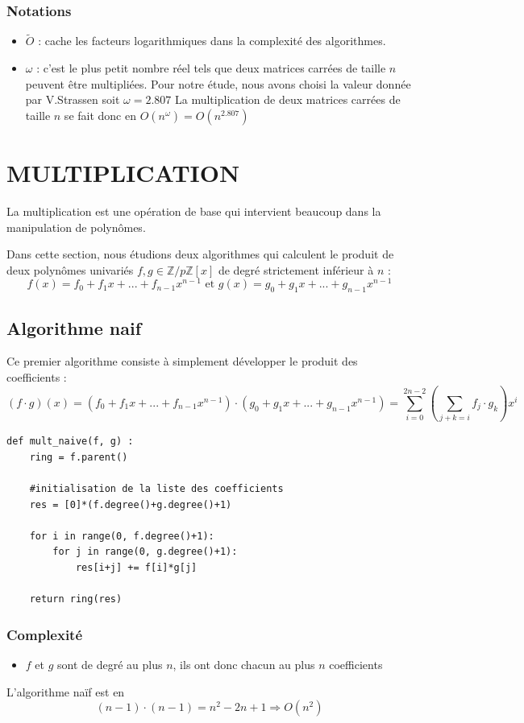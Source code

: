 \documentclass[a4paper]{article}
\begin{document}
\subsubsection*{Notations}
\begin{itemize}
\item $\tilde{O}$ : cache les facteurs logarithmiques dans la complexité des algorithmes.
\item $\omega$ : c'est le plus petit nombre réel tels que deux matrices carrées de taille $n$ peuvent être multipliées. Pour notre étude, nous avons choisi la valeur donnée par V.Strassen soit $\omega=2.807$
La multiplication de deux matrices carrées de taille $n$ se fait donc en $O(n^\omega)=O(n^{2.807})$
\end{itemize}


\section{MULTIPLICATION}

La multiplication est une opération de base qui intervient beaucoup dans la manipulation de polynômes.

Dans cette section, nous étudions deux algorithmes qui calculent le produit de deux polynômes univariés $f,g \in \mathbb{Z}/p\mathbb{Z}[x]$ de degré strictement inférieur à $n$ :
\[
f(x)=f_0+f_1x+...+f_{n-1}x^{n-1}\text{ et }g(x)=g_0+g_1x+...+g_{n-1}x^{n-1}
\]

\subsection{Algorithme naif}

Ce premier algorithme consiste à simplement développer le produit des coefficients :
\[
(f\cdot g)(x)=(f_0+f_1x+...+f_{n-1}x^{n-1})\cdot (g_0+g_1x+...+g_{n-1}x^{n-1})=\sum_{i=0}^{2n-2} (\sum_{j+k=i}f_j\cdot g_k) x^i
\]

\begin{lstlisting}[title={multiplication naive}]
    def mult_naive(f, g) :
    ring = f.parent()

    #initialisation de la liste des coefficients
    res = [0]*(f.degree()+g.degree()+1) 
    
    for i in range(0, f.degree()+1):
        for j in range(0, g.degree()+1):
            res[i+j] += f[i]*g[j]

    return ring(res) 
\end{lstlisting}

\subsubsection*{Complexité}
\begin{itemize} 
    \item $f$ et $g$ sont de degré au plus $n$, ils ont donc chacun au plus $n$ coefficients
\end{itemize}
L'algorithme naïf est en $$(n-1)\cdot (n-1) = n^2 - 2n + 1 \Longrightarrow O(n^2)$$
\end{document}
